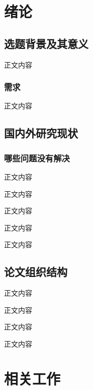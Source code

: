 \chapter{绪论}


\section{选题背景及其意义}
正文内容
\subsection{需求}
正文内容

\section{国内外研究现状}

\subsection{哪些问题没有解决}
正文内容

正文内容

正文内容

正文内容

正文内容

\section{论文组织结构}
正文内容

正文内容

正文内容

正文内容


\chapter{相关工作}

